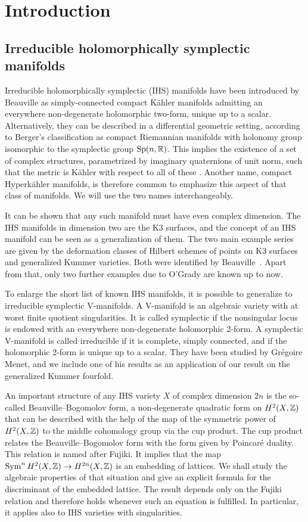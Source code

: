 
\section{Introduction}
\subsection{Irreducible holomorphically symplectic manifolds}
Irreducible holomorphically symplectic (IHS) manifolds have been introduced by Beauville \cite{Beauville} as simply-connected compact K\"ahler manifolds admitting an everywhere non-degenerate holomorphic two-form, unique up to a scalar. 
Alternatively, they can be described in a differential geometric setting, according to Berger's classification as compact Riemannian manifolds with holonomy group isomorphic to the symplectic group $\operatorname{Sp}(n,\mathbb{R})$. This implies the existence of a set of complex structures, parametrized by imaginary quaternions of unit norm, such that the metric is K\"ahler with respect to all of these \cite[Sect.~23]{Huybrechts}. 
Another name, compact Hyperk\"ahler manifolds, is therefore common to emphasize this aspect of that class of manifolds. We will use the two names interchangeably.

It can be shown that any such manifold must have even complex dimension. The IHS manifolds in dimension two are the K3 surfaces, and the concept of an IHS manifold can be seen as a generalization of them. The two main example series are given by the deformation classes of Hilbert schemes of points on K3 surfaces and generalized Kummer varieties. Both were identified by Beauville~\cite{Beauville}. Apart from that, only two further examples due to O'Grady are known up to now.

To enlarge the short list of known IHS manifolds, it is possible to generalize to irreducible symplectic V-manifolds. A V-manifold is an algebraic variety with at worst finite quotient singularities. It is called symplectic if the nonsingular locus is endowed with an everywhere non-degenerate holomorphic 2-form. 
A symplectic V-manifold is called irreducible if it is complete, simply connected, and if the holomorphic 2-form is unique up to a scalar. They have been studied by Gr\'egoire Menet, and we include one of his results as an application of our result on the generalized Kummer fourfold.

An important structure of any IHS variety $X$ of complex dimension $2n$ is the so-called Beauville--Bogomolov form, a non-degenerate quadratic form on $H^2(X,\mathbb{Z})$ that can be described with the help of the map of the symmetric power of $H^2(X,\mathbb{Z})$ to the middle cohomology group via the cup product. The cup product relates the Beauville--Bogomolov form with the form given by Poincar\'e duality. This relation is named after Fujiki. It implies that the map $\operatorname{Sym}^n H^2(X,\mathbb{Z})\rightarrow H^{2n}(X,\mathbb{Z})$ is an embedding of lattices. We shall study the algebraic properties of that situation and give an explicit formula for the discriminant of the embedded lattice. The result depends only on the Fujiki relation and therefore holds whenever such an equation is fulfilled. In particular, it applies also to IHS varieties with singularities.

